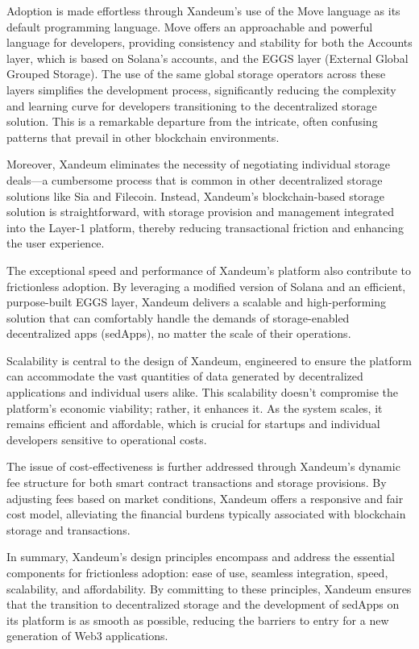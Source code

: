 \documentclass[11pt]{article}   	%
\begin{document}
Adoption is made effortless through Xandeum's use of the Move language as its default programming language. Move offers an approachable and powerful language for developers, providing consistency and stability for both the Accounts layer, which is based on Solana's accounts, and the EGGS layer (External Global Grouped Storage). The use of the same global storage operators across these layers simplifies the development process, significantly reducing the complexity and learning curve for developers transitioning to the decentralized storage solution. This is a remarkable departure from the intricate, often confusing patterns that prevail in other blockchain environments.

Moreover, Xandeum eliminates the necessity of negotiating individual storage deals—a cumbersome process that is common in other decentralized storage solutions like Sia and Filecoin. Instead, Xandeum's blockchain-based storage solution is straightforward, with storage provision and management integrated into the Layer-1 platform, thereby reducing transactional friction and enhancing the user experience.

The exceptional speed and performance of Xandeum's platform also contribute to frictionless adoption. By leveraging a modified version of Solana and an efficient, purpose-built EGGS layer, Xandeum delivers a scalable and high-performing solution that can comfortably handle the demands of storage-enabled decentralized apps (sedApps), no matter the scale of their operations.

Scalability is central to the design of Xandeum, engineered to ensure the platform can accommodate the vast quantities of data generated by decentralized applications and individual users alike. This scalability doesn't compromise the platform's economic viability; rather, it enhances it. As the system scales, it remains efficient and affordable, which is crucial for startups and individual developers sensitive to operational costs.

The issue of cost-effectiveness is further addressed through Xandeum's dynamic fee structure for both smart contract transactions and storage provisions. By adjusting fees based on market conditions, Xandeum offers a responsive and fair cost model, alleviating the financial burdens typically associated with blockchain storage and transactions.

In summary, Xandeum's design principles encompass and address the essential components for frictionless adoption: ease of use, seamless integration, speed, scalability, and affordability. By committing to these principles, Xandeum ensures that the transition to decentralized storage and the development of sedApps on its platform is as smooth as possible, reducing the barriers to entry for a new generation of Web3 applications.
\end{document}
